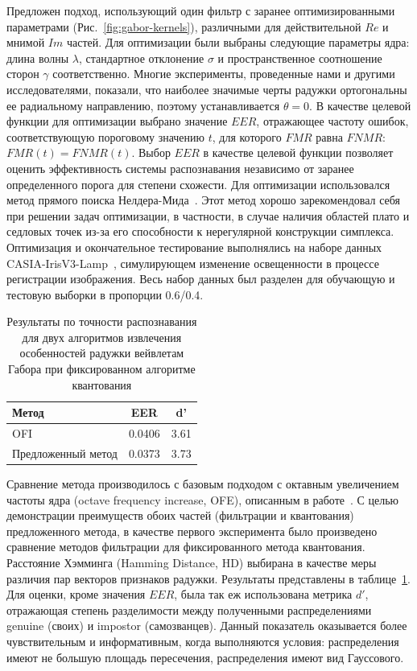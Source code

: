 Предложен подход, использующий один фильтр с заранее оптимизированными параметрами (Рис.~\ref{fig:gabor-kernels}), различными для действительной $Re$ и мнимой $Im$ частей. Для оптимизации были выбраны следующие параметры ядра: длина волны $\lambda$, стандартное отклонение $\sigma$ и пространственное соотношение сторон $\gamma$ соответственно. Многие эксперименты, проведенные нами и другими исследователями, показали, что наиболее значимые черты радужки ортогональны ее радиальному направлению, поэтому устанавливается $\theta=0$. В качестве целевой функции для оптимизации выбрано значение $EER$, отражающее частоту ошибок, соответствующую пороговому значению $t$, для которого $FMR$ равна $FNMR$: $FMR(t)=FNMR(t)$. Выбор $EER$ в качестве целевой функции позволяет оценить эффективность системы распознавания независимо от заранее определенного порога для степени схожести. Для оптимизации использовался метод прямого поиска Нелдера-Мида~\cite{nelder_mead_1965}. Этот метод хорошо зарекомендовал себя при решении задач оптимизации, в частности, в случае наличия областей плато и седловых точек из-за его способности к нерегулярной конструкции симплекса. Оптимизация и окончательное тестирование выполнялись на наборе данных CASIA-IrisV3-Lamp~\cite{casia_v3_lamp}, симулирующем изменение освещенности в процессе регистрации изображения. Весь набор данных был разделен для обучающую и тестовую выборки в пропорции 0.6/0.4.

\begin{table}[h]
\centering
	\begin{tabular}{|l|c|c|}\hline
		\textbf{Метод}						&\textbf{EER}	&\textbf{d'}\\\hline
		OFI~\cite{daugman_1993}		&0.0406	&3.61\\
		Предложенный метод			&0.0373	&3.73\\
		\hline
	\end{tabular}
	\caption{Результаты по точности распознавания для двух алгоритмов извлечения особенностей радужки вейвлетам Габора при фиксированном алгоритме квантования}
	\label{tab:gabor_eer}
\end{table}

Сравнение метода производилось с базовым подходом с октавным увеличением частоты ядра (octave frequency increase, OFE), описанным в  работе~\cite{daugman_1993}. С целью демонстрации преимуществ обоих частей (фильтрации и квантования) предложенного метода, в качестве первого эксперимента было произведено сравнение методов фильтрации для фиксированного метода квантования. Расстояние Хэмминга (Hamming Distance, HD) выбирана в качестве меры различия пар векторов признаков радужки. Результаты представлены в таблице~\ref{tab:gabor_eer}. Для оценки, кроме значения $EER$, была так еж использована метрика $d'$, отражающая степень разделимости между полученными распределениями genuine (своих) и impostor (самозванцев). Данный показатель оказывается более чувствительным и информативным, когда выполняются условия: распределения имеют не большую площадь пересечения, распределения имеют вид Гауссового.

